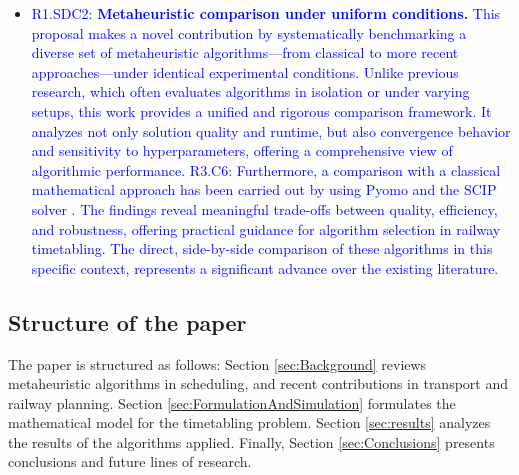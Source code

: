 \documentclass[Afour,sagev,times]{sagej}
\newcommand{\primero}[1]{\textcolor{blue}{#1}}
\newcommand{\tercero}[1]{\textcolor{blue}{#1}}
\begin{document}
\begin{itemize}

  \item \primero{R1.SDC2: \textbf{Metaheuristic comparison under uniform conditions.} This proposal makes a novel contribution by systematically benchmarking a diverse set of metaheuristic algorithms—from classical to more recent approaches—under identical experimental conditions. Unlike previous research, which often evaluates algorithms in isolation or under varying setups, this work provides a unified and rigorous comparison framework. It analyzes not only solution quality and runtime, but also convergence behavior and sensitivity to hyperparameters, offering a comprehensive view of algorithmic performance. \tercero{R3.C6: Furthermore, a comparison with a classical mathematical approach has been carried out by using Pyomo \cite{hart2011pyomo} and the \gls{SCIP} solver \cite{scip}}. The findings reveal meaningful trade-offs between quality, efficiency, and robustness, offering practical guidance for algorithm selection in railway timetabling. The direct, side-by-side comparison of these algorithms in this specific context, represents a significant advance over the existing literature. }

\end{itemize}

\subsection{Structure of the paper}
The paper is structured as follows: Section \ref{sec:Background} reviews metaheuristic algorithms in scheduling, and recent contributions in transport and railway planning. Section \ref{sec:FormulationAndSimulation} formulates the mathematical model for the timetabling problem. Section \ref{sec:results} analyzes the results of the algorithms applied. Finally, Section \ref{sec:Conclusions} presents conclusions and future lines of research.
\end{document}
